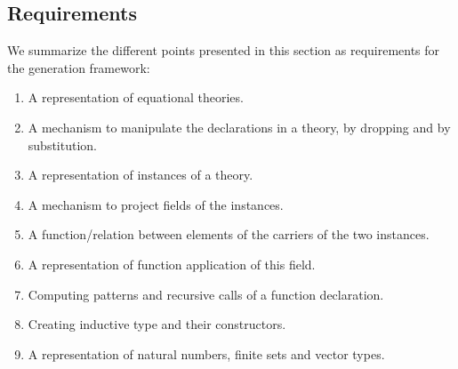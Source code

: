 \subsection{Requirements}
\label{sec:gen:reqs:summary}
We summarize the different points presented in this section as requirements for the generation framework: 
\begin{enumerate}
\item A representation of equational theories.  
\item A mechanism to manipulate the declarations in a theory, by dropping and by substitution. 
\item A representation of instances of a theory. 
\item A mechanism to project fields of the instances. 
\item A function/relation between elements of the carriers of the two instances. 
\item A representation of function application of this field.  
\item Computing patterns and recursive calls of a function declaration. 
\item Creating inductive type and their constructors. 
\item A representation of natural numbers, finite sets and vector types.    
\end{enumerate}

  




